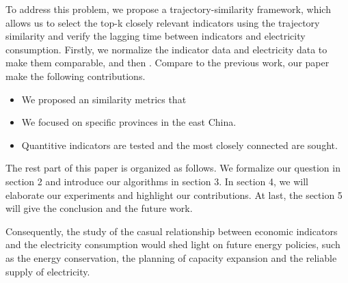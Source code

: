 To address this problem, we propose a trajectory-similarity framework, which allows us to select the top-k closely relevant indicators using the trajectory similarity and verify the lagging time between indicators and electricity consumption. Firstly, we normalize the indicator data and electricity data to make them comparable, and then . Compare to the previous work, our paper make the following contributions.
\begin{itemize}
	\item We proposed an similarity metrics that
	\item We focused on specific provinces in the east China.
	\item Quantitive indicators are tested and the most closely connected are sought.
\end{itemize}

The rest part of this paper is organized as follows. We formalize our question in section 2 and introduce our algorithms in section 3. In section 4, we will elaborate our experiments and highlight our contributions. At last, the section 5 will give the conclusion and the future work.

Consequently, the study of the casual relationship between economic indicators and the electricity consumption would shed light on future energy policies, such as the energy conservation, the planning of capacity expansion and the reliable supply of electricity.